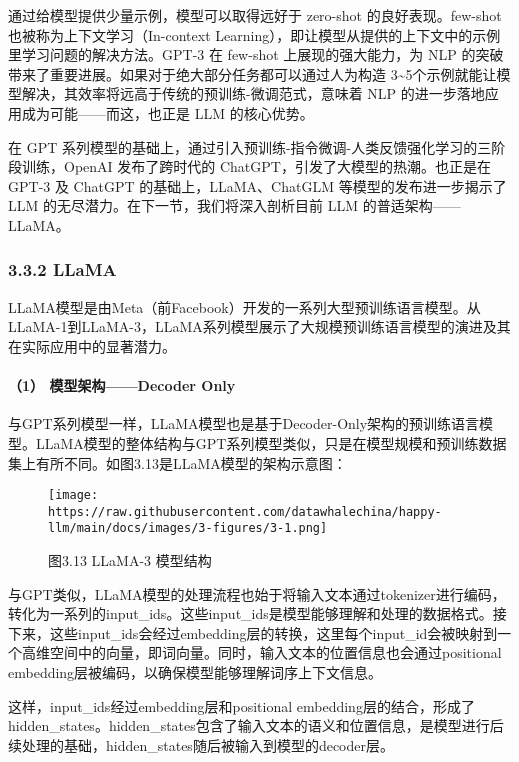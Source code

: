 \documentclass[12pt,a4paper]{book}
\begin{document}
通过给模型提供少量示例，模型可以取得远好于 zero-shot
的良好表现。few-shot 也被称为上下文学习（In-context
Learning），即让模型从提供的上下文中的示例里学习问题的解决方法。GPT-3 在
few-shot 上展现的强大能力，为 NLP
的突破带来了重要进展。如果对于绝大部分任务都可以通过人为构造
3\textasciitilde5个示例就能让模型解决，其效率将远高于传统的预训练-微调范式，意味着
NLP 的进一步落地应用成为可能------而这，也正是 LLM 的核心优势。

在 GPT
系列模型的基础上，通过引入预训练-指令微调-人类反馈强化学习的三阶段训练，OpenAI
发布了跨时代的 ChatGPT，引发了大模型的热潮。也正是在 GPT-3 及 ChatGPT
的基础上，LLaMA、ChatGLM 等模型的发布进一步揭示了 LLM
的无尽潜力。在下一节，我们将深入剖析目前 LLM 的普适架构------LLaMA。

\subsubsection{3.3.2 LLaMA}\label{llama}

LLaMA模型是由Meta（前Facebook）开发的一系列大型预训练语言模型。从LLaMA-1到LLaMA-3，LLaMA系列模型展示了大规模预训练语言模型的演进及其在实际应用中的显著潜力。

\paragraph{（1） 模型架构------Decoder
Only}\label{ux6a21ux578bux67b6ux6784decoder-only-1}

与GPT系列模型一样，LLaMA模型也是基于Decoder-Only架构的预训练语言模型。LLaMA模型的整体结构与GPT系列模型类似，只是在模型规模和预训练数据集上有所不同。如图3.13是LLaMA模型的架构示意图：

\begin{figure}[htbp]\centering
\texttt{[image: https://raw.githubusercontent.com/datawhalechina/happy-llm/main/docs/images/3-figures/3-1.png]}
\caption{图3.13 LLaMA-3 模型结构}
\end{figure}

与GPT类似，LLaMA模型的处理流程也始于将输入文本通过tokenizer进行编码，转化为一系列的input\_ids。这些input\_ids是模型能够理解和处理的数据格式。接下来，这些input\_ids会经过embedding层的转换，这里每个input\_id会被映射到一个高维空间中的向量，即词向量。同时，输入文本的位置信息也会通过positional
embedding层被编码，以确保模型能够理解词序上下文信息。

这样，input\_ids经过embedding层和positional
embedding层的结合，形成了hidden\_states。hidden\_states包含了输入文本的语义和位置信息，是模型进行后续处理的基础，hidden\_states随后被输入到模型的decoder层。
\end{document}
